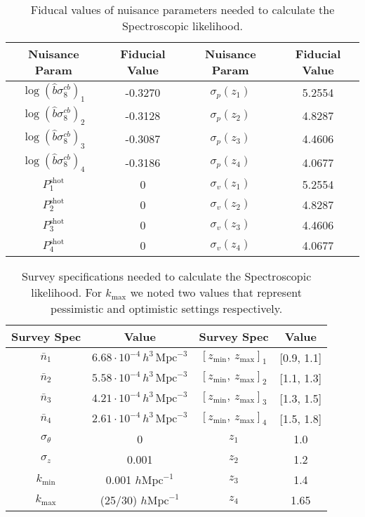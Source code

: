 \documentclass[oneside]{book}
\begin{document}
\begin{table}
    \centering
    \begin{tabular}{c|c||c|c}
    Nuisance Param &Fiducial Value&Nuisance Param &Fiducial Value\\
    \hline
    $\log\left(\hat{b}\sigma_8^{cb}\right)_1$ & -0.3270 & $\sigma_p(z_1)$ & 5.2554\\  
    $\log\left(\hat{b}\sigma_8^{cb}\right)_2$ & -0.3128 & $\sigma_p(z_2)$ & 4.8287\\  
    $\log\left(\hat{b}\sigma_8^{cb}\right)_3$ & -0.3087 & $\sigma_p(z_3)$ & 4.4606\\  
    $\log\left(\hat{b}\sigma_8^{cb}\right)_4$ & -0.3186 & $\sigma_p(z_4)$ & 4.0677\\  
    $ P_1^\mathrm{shot}$ & 0                            & $\sigma_v(z_1)$ & 5.2554\\  
    $ P_2^\mathrm{shot}$ & 0                            & $\sigma_v(z_2)$ & 4.8287\\  
    $ P_3^\mathrm{shot}$ & 0                            & $\sigma_v(z_3)$ & 4.4606\\  
    $ P_4^\mathrm{shot}$ & 0                            & $\sigma_v(z_4)$ & 4.0677\\  
\end{tabular}
\caption{Fiducal values of nuisance parameters needed to calculate the Spectroscopic likelihood.}
\label{tab:spectro_nuisance}
\end{table}

\begin{table}
    \centering
    \begin{tabular}{c|c||c|c}
    Survey Spec& Value&Survey Spec& Value\\
    \hline
     $\bar{n}_1$ & $6.68\cdot10^{-4}\,h^{3}\,\mathrm{Mpc}^{-3}$           &$[z_\mathrm{min},\:z_\mathrm{max}]_1$ & [0.9, 1.1]\\
     $\bar{n}_2$ & $5.58\cdot10^{-4}\,h^{3}\,\mathrm{Mpc}^{-3}$           &$[z_\mathrm{min},\:z_\mathrm{max}]_2$ & [1.1, 1.3]\\
     $\bar{n}_3$ & $4.21\cdot10^{-4}\,h^{3}\,\mathrm{Mpc}^{-3}$           &$[z_\mathrm{min},\:z_\mathrm{max}]_3$ & [1.3, 1.5]\\
     $\bar{n}_4$ & $2.61\cdot10^{-4}\,h^{3}\,\mathrm{Mpc}^{-3}$           &$[z_\mathrm{min},\:z_\mathrm{max}]_4$ & [1.5, 1.8]\\
     $\sigma_\theta$      & 0                            &$z_1$&1.0\\
     $\sigma_z$           & 0.001                        &$z_2$&1.2\\
     $k_\mathrm{min}$     & 0.001 $h \mathrm{Mpc}^{-1}  $&$z_3$&1.4\\
     $k_\mathrm{max}$     & (25/30) $h \mathrm{Mpc}^{-1}$&$z_4$&1.65\\
\end{tabular}
\caption{Survey specifications needed to calculate the Spectroscopic likelihood. For $k_\mathrm{max}$ we noted two values that represent pessimistic and optimistic settings respectively.}
\label{tab:spectro_specifics}
\end{table}
\end{document}
